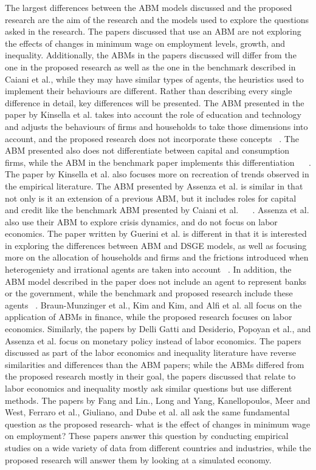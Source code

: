 \documentclass[11pt]{article}
\begin{document}
 The largest differences between the ABM models discussed and the proposed research
  are the aim of the research and the models used to explore the questions asked
in the research. The papers discussed that use an ABM are not exploring the
effects of changes in minimum wage on employment levels, growth, and inequality.
Additionally, the ABMs in the papers discussed will differ from the one in the
proposed research as well as the one in the benchmark described in Caiani et al.,
while they may have similar types of agents, the heuristics used to implement
their behaviours are different. Rather than describing every single difference
in detail, key differences will be presented.
The ABM presented in the paper by Kinsella et al. takes into account the role
of education and technology and adjusts the behaviours of firms and households
to take those dimensions into account, and the proposed research does not
incorporate these concepts ~\cite{Kinsella-education-paper}. The ABM presented
also does not differentiate between capital and consumption firms, while the
 ABM in the benchmark paper implements this differentiation ~\cite{Kinsella-education-paper} ~\cite{Caiani-benchmark-paper}.
The paper by Kinsella et al. also focuses more on recreation of trends observed
in the empirical literature. The ABM presented by Assenza et al. is similar in
that not only is it an extension of a previous ABM, but it includes roles for
capital and credit like the benchmark ABM presented by Caiani et al. ~\cite{Assenza-capital-paper} ~\cite{Caiani-benchmark-paper}.
Assenza et al. also use their ABM to explore crisis dynamics, and do not focus
on labor economics. The paper written by Guerini et al. is different in that
it is interested in exploring the differences between ABM and DSGE models, as
well as focusing more on the allocation of households and firms and the frictions
 introduced when heterogeniety and irrational agents are taken into account ~\cite{Guerini-wage-paper}.
 In addition, the ABM model described in the paper does not include an agent to
 represent banks or the government, while the benchmark and proposed research
 include these agents ~\cite{Caiani-benchmark-paper}. Braun-Munzinger et al.,
 Kim and Kim, and Alfi et al. all focus on the application of ABMs in finance,
 while the proposed research focuses on labor economics. Similarly, the papers
 by Delli Gatti and Desiderio, Popoyan et al., and Assenza et al. focus on
 monetary policy instead of labor economics. The papers discussed as part of the
 labor economics and inequality literature have reverse similarities and differences
 than the ABM papers; while the ABMs differed from the proposed research mostly
 in their goal, the papers discussed that relate to labor economics and inequality
mostly ask similar questions but use different methods. The papers by Fang and Lin.,
Long and Yang, Kanellopoulos, Meer and West, Ferraro et al., Giuliano, and Dube et al.
all ask the same fundamental question as the proposed research- what is the effect of
changes in minimum wage on employment? These papers answer this question by conducting
empirical studies on a wide variety of data from different countries and
industries, while the proposed research will answer them by looking at a
simulated economy.
\end{document}
